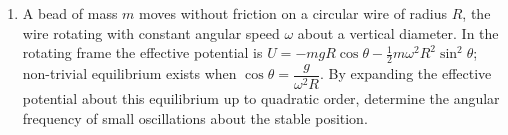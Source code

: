 \documentclass[12pt]{article}
\begin{document}
\begin{enumerate}
\begin{center}
\end{center}

A) \(\dfrac{MgL}{2\pi}\)\\

B) \(\dfrac{MgL}{\pi}\)\\

C) \(\dfrac{MgL}{4}\)\\

D) \(\dfrac{MgL}{2}\)

\item A bead of mass \(m\) moves without friction on a circular wire of radius \(R\), the wire rotating with constant angular speed \(\omega\) about a vertical diameter. In the rotating frame the effective potential is \(U=-mgR\cos\theta-\frac{1}{2}m\omega^2R^2\sin^2\theta\); non-trivial equilibrium exists when \(\cos\theta=\dfrac{g}{\omega^2R}\). By expanding the effective potential about this equilibrium up to quadratic order, determine the angular frequency of small oscillations about the stable position.\\

\begin{center}
\end{center}
\end{enumerate}
\end{document}
